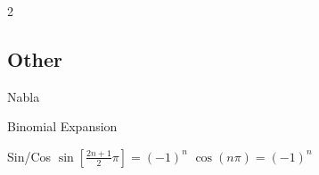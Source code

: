 \documentclass{note}
\begin{document}
\begin{multicols}{2}
{{    \subsection{Other}
    \begin{MyTh}{Nabla}
    \end{MyTh}


    \begin{MyTh}{Binomial Expansion}
         \quad {} \quad {}
    \end{MyTh}

    \begin{MyTh}{Sin/Cos}
        $\sin[\tfrac{2n+1}{2}\pi] = (-1)^n$ \quad $\cos(n\pi) = (-1)^n$
    \end{MyTh}

    }}


\end{multicols}
\end{document}
